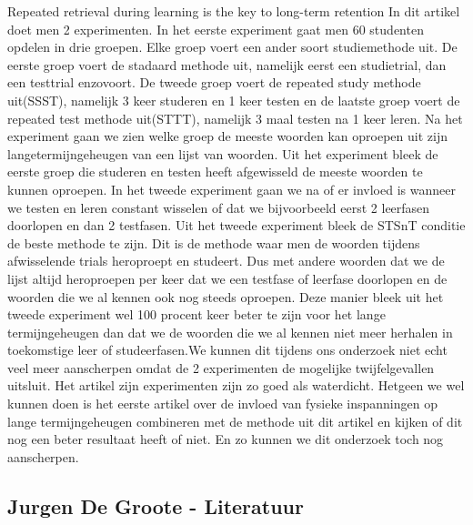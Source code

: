 \documentclass{hogent-article}
\begin{document}
	Repeated retrieval during learning is the key to long-term retention \autocite{Karpicke2007}
	In dit artikel doet men 2 experimenten. In het eerste experiment gaat men 60 studenten opdelen in drie groepen. Elke groep voert een ander soort studiemethode uit. De eerste groep voert de stadaard methode uit, namelijk eerst een studietrial, dan een testtrial enzovoort. De tweede groep voert de repeated study methode uit(SSST), namelijk 3 keer studeren en 1 keer testen en de laatste groep voert de repeated test methode uit(STTT), namelijk 3 maal testen na 1 keer leren. Na het experiment gaan we zien welke groep de meeste woorden kan oproepen uit zijn langetermijngeheugen van een lijst van woorden. Uit het experiment bleek de eerste groep die studeren en testen heeft afgewisseld de meeste woorden te kunnen oproepen. In het tweede experiment gaan we na of er invloed is wanneer we testen en leren constant wisselen of dat we bijvoorbeeld eerst 2 leerfasen doorlopen en dan 2 testfasen. Uit het tweede experiment bleek de STSnT conditie de beste methode te zijn. Dit is de methode waar men de woorden tijdens afwisselende trials heroproept en studeert. Dus met andere woorden dat we de lijst altijd heroproepen per keer dat we een testfase of leerfase doorlopen en de woorden die we al kennen ook nog steeds oproepen. Deze manier bleek uit het tweede experiment wel 100 procent keer beter te zijn voor het lange termijngeheugen dan dat we de woorden die we al kennen niet meer herhalen in toekomstige leer of studeerfasen.We kunnen dit tijdens ons onderzoek niet echt veel meer aanscherpen omdat de 2 experimenten de mogelijke twijfelgevallen uitsluit. Het artikel zijn experimenten zijn zo goed als waterdicht. Hetgeen we wel kunnen doen is het eerste artikel over de invloed van fysieke inspanningen op lange termijngeheugen combineren met de methode uit dit artikel en kijken of dit nog een beter resultaat heeft of niet. En zo kunnen we dit onderzoek toch nog aanscherpen.
	
	
	\subsection{Jurgen De Groote - Literatuur}
	
\end{document}
